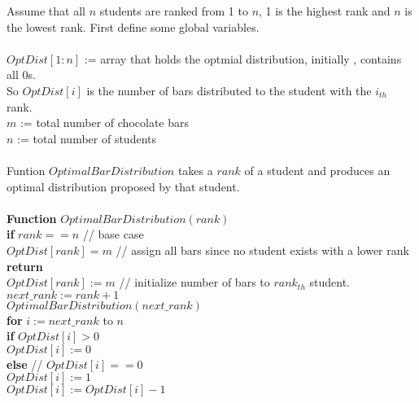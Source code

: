\documentclass[11pt]{article}
\begin{document}
Assume that all $n$ students are ranked from 1 to $n$, 1 is the
highest rank and $n$ is the lowest rank. First define some global variables.\\\\ 
$OptDist[1:n]$ := array that holds the optmial distribution, initially
, contains all 0s.\\
So $OptDist[i]$ is the number of bars distributed to the student with
the $i_{th}$ rank.\\
$m$ := total number of chocolate bars\\
$n$ := total number of students\\\\
Funtion $OptimalBarDistribution$ takes a $rank$ of a student
and produces an optimal distribution proposed by that student.\\\\
\textbf{Function} $OptimalBarDistribution( rank )$\\
\-\hspace{2em} \textbf{if} $rank == n$ // base case \\
\-\hspace{4em} $OptDist[rank] = m$ // assign all bars since no student
exists with a lower rank \\
\-\hspace{4em} \textbf{return}\\
\-\hspace{2em} $OptDist[rank] := m$ // initialize number of bars to
$rank_{th}$ student.\\
\-\hspace{2em} $next\_rank := rank+1$\\
\-\hspace{2em} $OptimalBarDistribution( next\_rank )$\\
\-\hspace{2em} \textbf{for} $i := next\_rank$ to $n$\\
\-\hspace{4em} \textbf{if} $OptDist[i] > 0$\\
\-\hspace{6em} $OptDist[i] := 0$\\
\-\hspace{4em} \textbf{else} // $OptDist[i] == 0$\\
\-\hspace{6em} $OptDist[i] := 1$\\
\-\hspace{6em} $OptDist[i] := OptDist[i] - 1$\\
\end{document}
